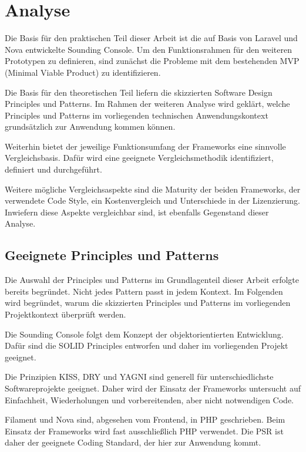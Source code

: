 \section{Analyse}
Die Basis für den praktischen Teil dieser Arbeit ist die auf Basis von Laravel und Nova entwickelte Sounding Console.
Um den Funktionsrahmen für den weiteren Prototypen zu definieren, sind zunächst die Probleme mit dem bestehenden MVP (Minimal Viable Product) zu identifizieren.

Die Basis für den theoretischen Teil liefern die skizzierten Software Design Principles und Patterns.
Im Rahmen der weiteren Analyse wird geklärt, welche Principles und Patterns im vorliegenden technischen Anwendungskontext grundsätzlich zur Anwendung kommen können.

Weiterhin bietet der jeweilige Funktionsumfang der Frameworks eine sinnvolle Vergleichsbasis.
Dafür wird eine geeignete Vergleichsmethodik identifiziert, definiert und durchgeführt.

Weitere mögliche Vergleichsaspekte sind die Maturity der beiden Frameworks, der verwendete Code Style, ein Kostenvergleich und Unterschiede in der Lizenzierung.
Inwiefern diese Aspekte vergleichbar sind, ist ebenfalls Gegenstand dieser Analyse.

\subsection{Geeignete Principles und Patterns}
Die Auswahl der Principles und Patterns im Grundlagenteil dieser Arbeit erfolgte bereits begründet.
Nicht jedes Pattern passt in jedem Kontext.
Im Folgenden wird begründet, warum die skizzierten Principles und Patterns im vorliegenden Projektkontext überprüft werden.

Die Sounding Console folgt dem Konzept der objektorientierten Entwicklung.
Dafür sind die SOLID Principles entworfen und daher im vorliegenden Projekt geeignet.

Die Prinzipien KISS, DRY und YAGNI sind generell für unterschiedlichste Softwareprojekte geeignet.
Daher wird der Einsatz der Frameworks untersucht auf Einfachheit, Wiederholungen und vorbereitenden, aber nicht notwendigen Code.

Filament und Nova sind, abgesehen vom Frontend, in PHP geschrieben.
Beim Einsatz der Frameworks wird fast ausschließlich PHP verwendet.
Die PSR ist daher der geeignete Coding Standard, der hier zur Anwendung kommt.

\newpage

